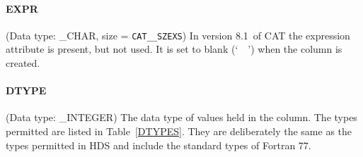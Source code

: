 \documentclass[11pt,twoside]{starlink}
\providecommand{\CATversion}{8.1~}
\begin{document}
\paragraph{EXPR}
(Data type: \_CHAR, size = \texttt{CAT\_\_SZEXS})
In version \CATversion of CAT the expression attribute is present, but
not used. It is set to blank (`~~') when the column is created.

\paragraph{DTYPE}
(Data type: \_INTEGER)
The data type of values held in the column. The types permitted are
listed in Table~\ref{DTYPES}. They are deliberately the same as the
types permitted in HDS and include the standard types of Fortran 77.
\end{document}

